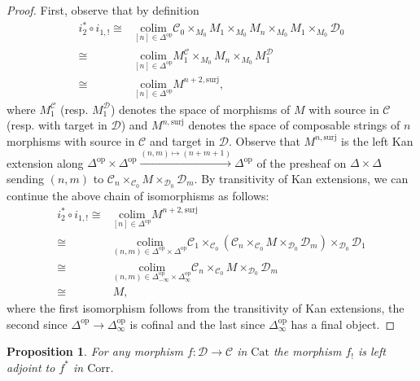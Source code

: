 \documentclass[a4paper, reqno]{amsart}
\newtheorem{prop}[theorem]{Proposition}
\theoremstyle{definition}
\newcommand\cC{\mathscr C}
\newcommand\cD{\mathscr D}
\newcommand\op{\mathrm{op}}
\newcommand\colim{\mathrm{colim}}
\newcommand\sur{\mathrm{surj}}
\begin{document}
\begin{proof}
First, observe that by definition 
\begin{equation*}
    \begin{split}
    i_2^*\circ i_{1,!}\cong& \underset{[n]\in\Delta^\op}{\colim}\cC_0\times_{M_0}M_1\times_{M_0}M_n\times_{M_0}M_1\times_{M_0}\cD_0\\
    \cong& \underset{[n]\in\Delta^\op}{\colim}M_1^\cC\times_{M_0}M_n\times_{M_0}M_1^\cD\\
    \cong& \underset{[n]\in\Delta^\op}{\colim}M^{n+2,\sur},
    \end{split}
\end{equation*}
where $M_1^\cC$ (resp. $M_1^\cD$) denotes the space of morphisms of $M$ with source in $\cC$ (resp. with target in $\cD$) and $M^{n,\sur}$ denotes the space of composable strings of $n$ morphisms with source in $\cC$ and target in $\cD$. Observe that $M^{n,\sur}$ is the left Kan extension along $\Delta^\op\times \Delta^\op\xrightarrow{(n,m)\mapsto(n+m+1)}\Delta^\op$ of the presheaf on $\Delta\times\Delta$ sending $(n,m)$ to $\cC_n\times_{\cC_0}M\times_{\cD_0}\cD_m$. By transitivity of Kan extensions, we can continue the above chain of isomorphisms as follows:
\begin{equation*}
    \begin{split}
        i_2^*\circ i_{1,!}\cong&\underset{[n]\in\Delta^\op}{\colim}M^{n+2,\sur}\\
        \cong&\underset{(n,m)\in\Delta^\op\times \Delta^\op}{\colim}\cC_1\times_{\cC_0}(\cC_n\times_{\cC_0}M\times_{\cD_0}\cD_m)\times_{\cD_0}\cD_1\\
        \cong&\underset{(n,m)\in\Delta_{-\infty}^\op\times \Delta_\infty^\op}{\colim}\cC_n\times_{\cC_0}M\times_{\cD_0}\cD_m\\
        \cong&M,
    \end{split}
\end{equation*}
where the first isomorphism follows from the transitivity of Kan extensions, the second since $\Delta^\op\rightarrow\Delta^\op_{\infty}$ is cofinal and the last since $\Delta^\op_{\infty}$ has a final object.
\end{proof}
\begin{prop}\label{prop:adj}
For any morphism $f:\cD\rightarrow\cC$ in $\mathrm{Cat}$ the morphism $f_!$ is left adjoint to $f^*$ in $\mathrm{Corr}$.
\end{prop}
\end{document}
